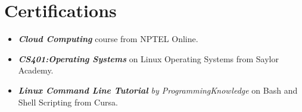 \documentclass[letterpaper,11pt]{article}
\newcommand{\resumeItem}[1]{
  \item\small{
    {#1 \vspace{-2pt}}
  }
}
\newcommand{\resumeItemListStart}{\begin{itemize}}
\newcommand{\resumeItemListEnd}{\end{itemize}\vspace{-5pt}}
\begin{document}
            
            
    
 
\section{Certifications }
 
            \begin{itemize}[itemsep=-5pt, parsep=10pt]
                \item \textbf{\textit{Cloud Computing}} course from NPTEL Online.
                \item \textbf{\textit{CS401:Operating Systems}} on Linux Operating Systems from Saylor Academy.
                \item \textit{\textbf{Linux Command Line Tutorial} by ProgrammingKnowledge} on Bash and Shell Scripting from Cursa.
            \end{itemize}
        \vspace*{3.0\multicolsep}
        \vspace{-5pt}
        
\end{document}
